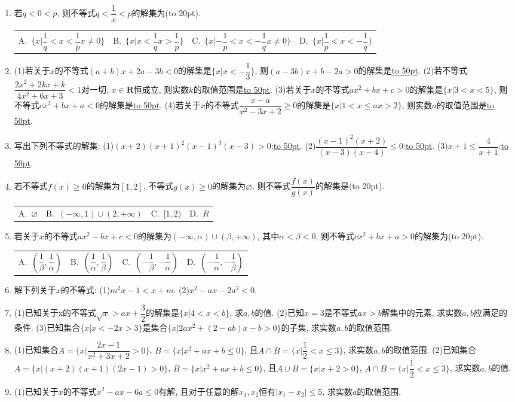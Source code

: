 \documentclass[10pt,a4paper]{article}
\newcommand{\blank}[1]{\underline{\hbox to #1pt{}}}
\newcommand{\bracket}[1]{(\hbox to #1pt{})}
\newcommand{\fourch}[4]{\par\begin{tabular}{p{.23\textwidth}p{.23\textwidth}p{.23\textwidth}p{.23\textwidth}}
A.~#1 &B.~#2& C.~#3& D.~#4
\end{tabular}}
\begin{document}
\begin{enumerate}[1.]
    \fourch{$(-\infty ,2 ]$}{$(\infty ,-2)$}{$(-2,2 ]$}{$(-2,2)$}
    \item 若$q<0<p$, 则不等式$q<\dfrac 1x<p$的解集为\bracket{20}.
    \fourch{$\{x|\dfrac 1q<x<\dfrac 1px\ne 0\}$}{$\{x|x<\dfrac 1qx>\dfrac 1p\}$}{$\{x|-\dfrac 1p<x<-\dfrac 1qx\ne 0\}$}{$\{x|\dfrac 1p<x<-\dfrac 1q\}$}
    \item (1)若关于$x$的不等式$(a+b)x+2a-3b<0$的解集是$\{x|x<-\dfrac 13\}$, 则$(a-3b)x+b-2a>0$的解集是\blank{50}.
    (2)若不等式$\dfrac{2{x^2}+2kx+k}{4{x^2}+6x+3}<1$对一切, $x\in \mathbf{R}$恒成立, 则实数$k$的取值范围是\blank{50}.
    (3)若关于$x$的不等式$ax^2+bx+c>0$的解集是$\{x|3<x<5\}$, 则不等式$cx^2+bx+a<0$的解集是\blank{50}.
    (4)若关于$x$的不等式$\dfrac{x-a}{{x^2}-3x+2}\ge 0$的解集是$\{x|1<x\le ax>2\}$, 则实数$a$的取值范围是\blank{50}.
    \item 写出下列不等式的解集:
    (1)$(x+2)(x+1)^2(x-1)^3(x-3)>0$:\blank{50}.
    (2)$\dfrac{(x-1)^2(x+2)}{(x-3)(x-4)}\le 0$:\blank{50}.
    (3)$x+1\le \dfrac 4{x+1}$:\blank{50}.
    \item 若不等式$f(x)\ge 0$的解集为$[ 1,2 ]$, 不等式$g(x)\ge 0$的解集为$\varnothing$, 则不等式$\dfrac{f(x)}{g(x)}$的解集是\bracket{20}.
    \fourch{$\varnothing$}{$(-\infty ,1)\cup (2,+\infty)$}{$[ 1,2)$}{$R$}
    \item 若关于$x$的不等式$ax^2-bx+c<0$的解集为$(-\infty ,\alpha)\cup (\beta ,+\infty)$, 其中$\alpha <\beta <0$, 则不等式$cx^2+bx+a>0$的解集为\bracket{20}.
    \fourch{$(\dfrac 1{\beta },\dfrac 1{\alpha })$}{$(\dfrac 1{\alpha },\dfrac 1{\beta })$}{$(-\dfrac 1{\beta },-\dfrac 1{\alpha })$}{$(-\dfrac 1{\alpha },-\dfrac 1{\beta })$}
    \item 解下列关于$x$的不等式:
    (1)$m^2x-1<x+m$.				(2)$x^2-ax-2a^2<0$.
    \item (1)已知关于x的不等式$\sqrt x>ax+\dfrac 32$的解集是$\{x|4<x<b\}$, 求$a,b$的值.
    (2)已知$x=3$是不等式$ax>b$解集中的元素, 求实数$a,b$应满足的条件.
    (3)已知集合$\{x|x<-2x>3\}$是集合$\{x|2ax^2+(2-ab)x-b>0\}$的子集, 求实数$a,b$的取值范围.
    \item (1)已知集合$A=\{x|\dfrac{2x-1}{{x^2}+3x+2}>0\}$, $B=\{x|x^2+ax+b\le 0\}$, 且$A\cap B=\{x|\dfrac 12<x\le 3\}$, 求实数$a,b$的取值范围.
    (2)已知集合$A=\{x|(x+2)(x+1)(2x-1)>0\}$, $B=\{x|x^2+ax+b\le 0\}$, 且$A\cup B=\{x|x+2 >0\}$, $A\cap B=\{x|\dfrac 12<x\le 3\}$, 求实数$a,b$的值.
    \item (1)已知关于$x$的不等式$x^2-ax-6a\le 0$有解, 且对于任意的解$x_1,x_2$恒有$|x_1-x_2|\le 5$, 求实数$a$的取值范围.

\end{enumerate}
\end{document}
